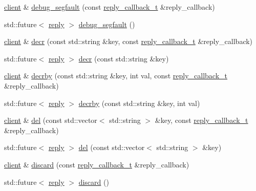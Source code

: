 \begin{DoxyCompactItemize}
\item 
\hyperlink{classcpp__redis_1_1client}{client} \& \hyperlink{classcpp__redis_1_1client_ac5d06ca1072ef1a83a8843c448e4d1e3}{debug\+\_\+segfault} (const \hyperlink{classcpp__redis_1_1client_a061a1140d36d2eaeda82b09a0bb3f9f2}{reply\+\_\+callback\+\_\+t} \&reply\+\_\+callback)
\item 
std\+::future$<$ \hyperlink{classcpp__redis_1_1reply}{reply} $>$ \hyperlink{classcpp__redis_1_1client_a764786e7003c538a6cf0a5d6b44d66dd}{debug\+\_\+segfault} ()
\item 
\hyperlink{classcpp__redis_1_1client}{client} \& \hyperlink{classcpp__redis_1_1client_a8e09d5753d9f9ba00b1d5e8aed306189}{decr} (const std\+::string \&key, const \hyperlink{classcpp__redis_1_1client_a061a1140d36d2eaeda82b09a0bb3f9f2}{reply\+\_\+callback\+\_\+t} \&reply\+\_\+callback)
\item 
std\+::future$<$ \hyperlink{classcpp__redis_1_1reply}{reply} $>$ \hyperlink{classcpp__redis_1_1client_ac80abd9a238a7613294d4444bbc92907}{decr} (const std\+::string \&key)
\item 
\hyperlink{classcpp__redis_1_1client}{client} \& \hyperlink{classcpp__redis_1_1client_aaa45a662abeaa66f5a8c985cd27957c8}{decrby} (const std\+::string \&key, int val, const \hyperlink{classcpp__redis_1_1client_a061a1140d36d2eaeda82b09a0bb3f9f2}{reply\+\_\+callback\+\_\+t} \&reply\+\_\+callback)
\item 
std\+::future$<$ \hyperlink{classcpp__redis_1_1reply}{reply} $>$ \hyperlink{classcpp__redis_1_1client_ac4fe81368d7f9cc305811d8346e60881}{decrby} (const std\+::string \&key, int val)
\item 
\hyperlink{classcpp__redis_1_1client}{client} \& \hyperlink{classcpp__redis_1_1client_a29a5307b20d9ffe951e2ff302797a296}{del} (const std\+::vector$<$ std\+::string $>$ \&key, const \hyperlink{classcpp__redis_1_1client_a061a1140d36d2eaeda82b09a0bb3f9f2}{reply\+\_\+callback\+\_\+t} \&reply\+\_\+callback)
\item 
std\+::future$<$ \hyperlink{classcpp__redis_1_1reply}{reply} $>$ \hyperlink{classcpp__redis_1_1client_a99c090de7e23accfaf3b93f4b025d2e9}{del} (const std\+::vector$<$ std\+::string $>$ \&key)
\item 
\hyperlink{classcpp__redis_1_1client}{client} \& \hyperlink{classcpp__redis_1_1client_a0f5a07744750f87504f72dcf66144a24}{discard} (const \hyperlink{classcpp__redis_1_1client_a061a1140d36d2eaeda82b09a0bb3f9f2}{reply\+\_\+callback\+\_\+t} \&reply\+\_\+callback)
\item 
std\+::future$<$ \hyperlink{classcpp__redis_1_1reply}{reply} $>$ \hyperlink{classcpp__redis_1_1client_ab37e125f4f94bfa9455dc29f64698e47}{discard} ()

\end{DoxyCompactItemize}
